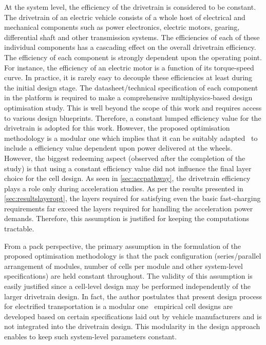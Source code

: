 \addlines[-0.5]
At  the system  level, the  efficiency  of the  drivetrain is  considered to  be
constant. The  drivetrain of  an electric  vehicle consists of  a whole  host of
electrical and mechanical components such as power electronics, electric motors,
gearing, differential shaft and other  transmission systems. The efficiencies of
each  of these  individual  components has  a cascading  effect  on the  overall
drivetrain efficiency.  The efficiency of  each component is  strongly dependent
upon the operating point. For instance, the efficiency of an electric motor is a
function  of  its  torque-speed  curve.  In  practice,  it  is  rarely  easy  to
decouple  these efficiencies  at  least  during the  initial  design stage.  The
datasheet/technical specification of each component  in the platform is required
to make  a comprehensive multiphysics-based  design optimisation study.  This is
well  beyond the  scope  of this  work  and requires  access  to various  design
blueprints. Therefore, a constant lumped  efficiency value for the drivetrain is
adopted  for this  work. However,  the  proposed optimisation  methodology is  a
modular  one which  implies that  it can  be suitably  adapted \eg~to  include a
efficiency  value dependent  upon power  delivered at  the wheels.  However, the
biggest redeeming  aspect (observed after the  completion of the study)  is that
using a constant  efficiency value did not influence the  final layer choice for
the cell  design. As  seen in  \cref{sec:accpathway}, the  drivetrain efficiency
plays a role  only during acceleration studies. As per  the results presented in
\cref{sec:resultslayeropt}, the  layers required  for satisfying even  the basic
fast-charging  requirements far  exceed  the layers  required  for handling  the
acceleration power demands. Therefore, this  assumption is justified for keeping
the computations tractable.

From  a  pack  perspective,  the   primary  assumption  in  the  formulation  of
the   proposed  optimisation   methodology  is   that  the   pack  configuration
(series/parallel arrangement  of modules, number  of cells per module  and other
system-level specifications) are held constant  throughout. The validity of this
assumption  is easily  justified  since  a cell-level  design  may be  performed
independently of  the larger drivetrain  design. In fact, the  author postulates
that  present design  process for  electrified transportation  is a  modular one
\ie~empirical cell designs are  developed based on certain specifications laid
out by vehicle  manufacturers and is not integrated into  the drivetrain design.
This  modularity  in the  design  approach  enables  to keep  such  system-level
parameters constant.

